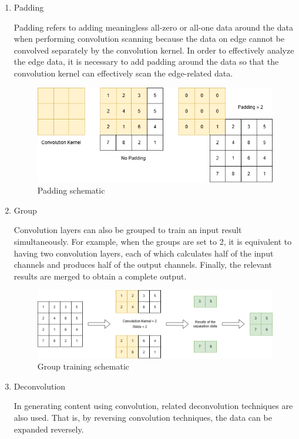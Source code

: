 \documentclass[10pt,journal,compsoc]{IEEEtran}
\begin{document}
\begin{enumerate}
    \item Padding

Padding refers to adding meaningless all-zero or all-one data around the data when performing convolution scanning because the data on edge cannot be convolved separately by the convolution kernel. In order to effectively analyze the edge data, it is necessary to add padding around the data so that the convolution kernel can effectively scan the edge-related data.

\begin{figure}
    \centering
    \includegraphics[scale=0.4] {PNG/2-10.png}
    \caption{Padding schematic}
    \label{fig:2-10}
\end{figure}

    \item Group

Convolution layers can also be grouped to train an input result simultaneously. For example, when the groups are set to 2, it is equivalent to having two convolution layers, each of which calculates half of the input channels and produces half of the output channels. Finally, the relevant results are merged to obtain a complete output.

\begin{figure}
    \centering
    \includegraphics[scale=0.3] {PNG/2-11.png}
    \caption{Group training schematic}
    \label{fig:2-11}
\end{figure}

    \item Deconvolution

In generating content using convolution, related deconvolution techniques are also used. That is, by reversing convolution techniques, the data can be expanded reversely.


\end{enumerate}
\end{document}
